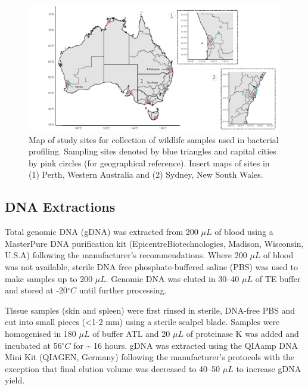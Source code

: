 \documentclass[a4paper, nobind]{templates/ociamthesis}
\begin{document}
\begin{figure}
\includegraphics[width=0.95\linewidth]{figures/ms-figs/Ch3-map} \caption[Map of study sites for wildlife samples.]{Map of study sites for collection of wildlife samples used in bacterial profiling. Sampling sites denoted by blue triangles and capital cities by pink circles (for geographical reference). Insert maps of sites in (1) Perth, Western Australia and (2) Sydney, New South Wales.}\label{fig:F3map}
\end{figure}

\hypertarget{dna-extractions}{%
\subsection{DNA Extractions}\label{dna-extractions}}

Total genomic DNA (gDNA) was extracted from 200 \(\mu L\) of blood using a MasterPure DNA purification kit (Epicentre\textregistered Biotechnologies, Madison, Wisconsin, U.S.A) following the manufacturer's recommendations. Where 200 \(\mu L\) of blood was not available, sterile DNA free phosphate-buffered saline (PBS) was used to make samples up to 200 \(\mu L\).
Genomic DNA was eluted in 30--40 \(\mu L\) of TE buffer and stored at -20\(^\circ C\) until further processing.

Tissue samples (skin and spleen) were first rinsed in sterile, DNA-free PBS and cut into small pieces (\textless1-2 mm) using a sterile scalpel blade.
Samples were homogenised in 180 \(\mu L\) of buffer ATL and 20 \(\mu L\) of proteinase K was added and incubated at 56\(^\circ C\) for \textasciitilde{} 16 hours. gDNA was extracted using the QIAamp DNA Mini Kit (QIAGEN, Germany) following the manufacturer's protocols with the exception that final elution volume was decreased to 40--50 \(\mu L\) to increase gDNA yield.
\end{document}

